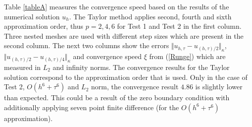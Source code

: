 \documentclass[%
 aip,
cp,  %
 amsmath,amssymb,%
 reprint,%
]{revtex4-2}
\newcommand{\rf}[1]{(\ref{#1})}
\begin{document}
Table \ref{tableA} measures the convergence speed based on the results of the numerical solution $u_h$. The Taylor method applies second, fourth and sixth approximation order, thus $p=2,4,6$ for Test 1 and Test 2 in the first column. Three nested meshes are used with different step sizes which are present in the second column. The next two columns show the errors $\Vert u_{h,\tau} - u_{(h,\tau)/2} \Vert_\kappa$, $\Vert  u_{(h,\tau)/2} - u_{(h,\tau)/4} \Vert_\kappa$ and convergence speed $\xi$ from \rf{Runge} which are measured in $L_2$ and infinity norms. The convergence results for the Taylor solution correspond to the approximation order that is used. Only in the case of Test 2, $O(h^6 + \tau^6)$ and $L_2$ norm, the convergence result $4.86$ is slightly lower than expected. This could be a result of the zero boundary condition with additionally applying seven point finite difference (for the $O(h^6 + \tau^6)$ approximation).
\end{document}
